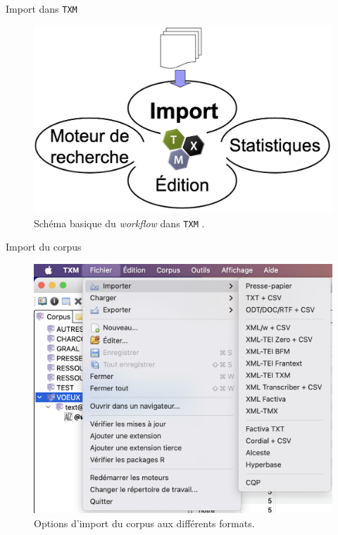 \documentclass[xetex,xcolor={table,usenames,dvipsnames}]{beamer}
\begin{document}
\begin{frame}{Import dans \texttt{TXM}}
	\begin{figure}[h] %
		\centering
		\includegraphics[width=1\linewidth]{img/import_txm.png}
		\caption{Schéma basique du \textit{workflow} dans \texttt{TXM} \citep{heiden}.}
		\label{fig:ling_out_TAL}
	\end{figure}
\end{frame}




\begin{frame}{Import du corpus}
	\begin{figure}[h] %
		\centering
		\includegraphics[width=0.7\linewidth]{img/import_corpus.png}
		\caption{Options d'import du corpus aux différents formats.}
		\label{fig:ling_out_TAL}
	\end{figure}
\end{frame}
\end{document}

